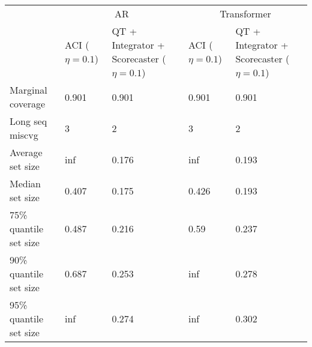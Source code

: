 \begin{tabular}{lllll}
\toprule
& \multicolumn{2}{c}{AR}& \multicolumn{2}{c}{Transformer} \\
& ACI ($\eta=0.1$) & QT + Integrator + Scorecaster ($\eta=0.1$) & ACI ($\eta=0.1$) & QT + Integrator + Scorecaster ($\eta=0.1$) \\
\midrule
Marginal coverage & 0.901 & 0.901 & 0.901 & 0.901 \\
Long seq miscvg & 3 & 2 & 3 & 2 \\
Average set size & inf & 0.176 & inf & 0.193 \\
Median set size & 0.407 & 0.175 & 0.426 & 0.193 \\
75\% quantile set size & 0.487 & 0.216 & 0.59 & 0.237 \\
90\% quantile set size & 0.687 & 0.253 & inf & 0.278 \\
95\% quantile set size & inf & 0.274 & inf & 0.302 \\
\bottomrule
\end{tabular}
